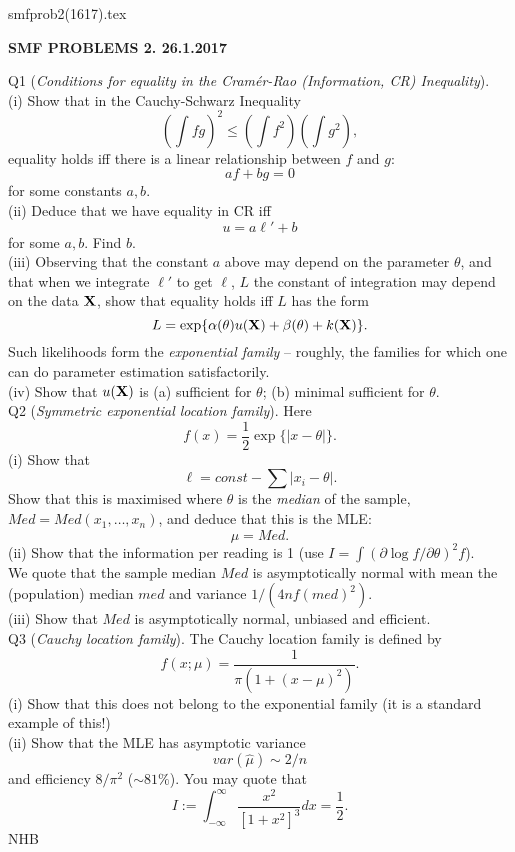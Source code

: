 \documentclass[12pt]{article}
\begin{document}
\def\ni{\noindent}
\def\i{\indent}
\def\a{\alpha}
\def\b{\beta}
\def\e{\epsilon}
\def\d{\delta}
\def\g{\gamma}
\def\qq{\qquad}
\def\L{\Lambda}
\def\C{\cal C}
\def\E{\cal E}
\def\G{\Gamma}
\def\F{\cal F}
\def\K{\cal K}
\def\O{\cal O}
\def\A{\cal A}
\def\B{\cal B}
\def\S{\cal S}
\def\N{\cal N}
\def\M{\cal M}
\def\P{\cal P}
\def\Om{\Omega}
\def\om{\omega}
\def\s{\sigma}
\def\t{\theta}
\def\z{\zeta}
\def\p{\phi}
\def\m{\mu}
\def\n{\nu}
\def\b{\beta}
\def\e{\epsilon}
\def\l{\lambda}
\def\Si{\Sigma}
\def\half{\frac{1}{2}}
\def\hb{\hfil \break}
\ni smfprob2(1617).tex \\
\begin{center}
{\bf SMF PROBLEMS 2.  26.1.2017} \\
\end{center}

\ni Q1 ({\it Conditions for equality in the Cram\'er-Rao (Information, CR) Inequality}). \\
(i) Show that in the Cauchy-Schwarz Inequality
$$
(\int fg)^2 \leq (\int f^2)(\int g^2),
$$
equality holds iff there is a linear relationship between $f$ and $g$:
$$
af + bg = 0
$$
for some constants $a, b$. \\
(ii) Deduce that we have equality in CR iff
$$
u = a {\ell}' + b
$$
for some $a,b$.  Find $b$. \\
(iii) Observing that the constant $a$ above may depend on the parameter $\t$, and that when we integrate ${\ell}'$ to get $\ell$, $L$ the constant of integration may depend on the data $\bf X$, show that equality holds iff $L$ has the form
$$
L = \exp \{ \a(\t) u({\bf X}) + \b(\t) + k({\bf X}) \}.
$$
Such likelihoods form the {\it exponential family} -- roughly, the families for which one can do parameter estimation satisfactorily. \\
(iv) Show that $u({\bf X})$ is (a) sufficient for $\t$; (b) minimal sufficient for $\t$. \\

\ni Q2 ({\it Symmetric exponential location family}).  Here
$$
f(x) = \half \exp \{ |x - \t | \}.
$$
(i) Show that
$$
\ell = const - \sum |x_i - \t|.
$$
Show that this is maximised where $\t$ is the {\it median} of the sample, $Med = Med(x_1, \ldots, x_n)$, and deduce that this is the MLE:
$$
\hat{\m} = Med.
$$
(ii) Show that the information per reading is 1 (use $I = \int (\partial \log f/\partial \t)^2 f$). \\
\i We quote that the sample median $Med$ is asymptotically normal with mean the (population) median $med$ and variance $1/(4 n f(med)^2)$. \\
(iii) Show that $Med$ is asymptotically normal, unbiased and efficient. \\

\ni Q3 ({\it Cauchy location family}).  The Cauchy location family is defined by
$$
f(x; \m) = \frac{1}{\pi(1 + (x - \m)^2)}.
$$
(i) Show that this does not belong to the exponential family (it is a standard example of this!) \\
(ii) Show that the MLE has asymptotic variance
$$
var(\hat{\m}) \sim 2/n
$$
and efficiency $8/{\pi}^2$ ($\sim 81\%$).
You may quote that
$$
I := \int_{-\infty}^{\infty} \frac{x^2}{[1 + x^2]^3} dx = \half.
$$
\hfil NHB \break
\end{document}
